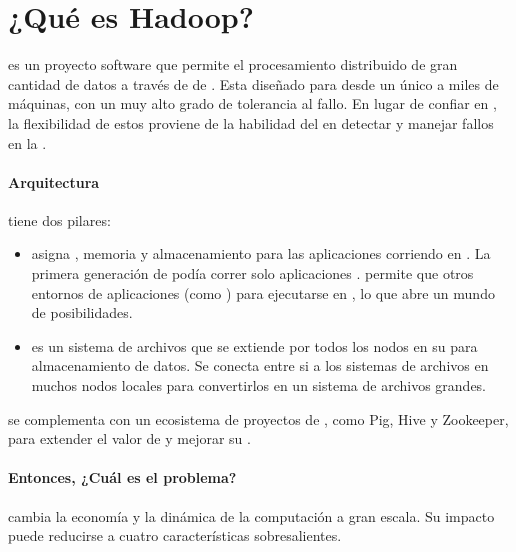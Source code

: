 \chapter{¿Qué es Hadoop? \cite{online_hadoop_description}}\label{ap:apendice_hadoop_description}
\apacheNAME \hadoopNAME es un proyecto software \openSourcePC que permite el procesamiento distribuido de gran cantidad de datos a través de \clustersAS de \serversAS. Esta diseñado para \scaleUpQA desde un único \serverAS a miles de máquinas, con un muy alto grado de tolerancia al fallo. En lugar de confiar en \highEndCPT \hardwarePC, la flexibilidad de estos \clustersAS proviene de la habilidad del \softwarePC en detectar y manejar fallos en la \applayer.

\subsubsection*{Arquitectura \highLevelCPT} 
\apacheNAME \hadoopNAME tiene dos pilares:

\begin{itemize}
	\item \hadoopYarnNAME asigna \cpuPC, memoria y almacenamiento para las aplicaciones corriendo en \clustersAS \hadoopNAME. La primera generación de \hadoopNAME podía correr solo aplicaciones \hadoopMapReduceNAME. \hadoopYarnNAME permite que otros entornos de aplicaciones (como \sparkNAME) para ejecutarse en \hadoopNAME, lo que abre un mundo de posibilidades.
	
	\item {} es un sistema de archivos que se extiende por todos los nodos en su \clusterAS \hadoopNAME para almacenamiento de datos. Se conecta entre si a los sistemas de archivos en muchos nodos locales para convertirlos en un sistema de archivos grandes.
\end{itemize}

\hadoopNAME se complementa con un ecosistema de proyectos de \apacheNAME, como Pig\cite{online_ibm_meaning_pig}, Hive\cite{online_ibm_meaning_hive} y Zookeeper\cite{online_ibm_meaning_zookeeper}, para extender el valor de \hadoopNAME y mejorar su \usabilityQA.


\subsubsection*{Entonces, ¿Cuál es el problema?}

\hadoopNAME cambia la economía y la dinámica de la computación a gran escala. Su impacto puede reducirse a cuatro características sobresalientes.

